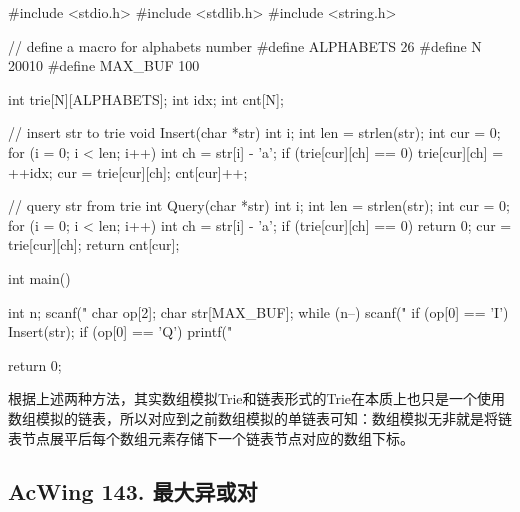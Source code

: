 \begin{mycpptwocol}[数组模拟Trie]
    #include <stdio.h>
    #include <stdlib.h>
    #include <string.h>

    // define a macro for alphabets number
    #define ALPHABETS 26
    #define N 20010
    #define MAX_BUF 100

    int trie[N][ALPHABETS];
    int idx;
    int cnt[N];

    // insert str to trie
    void Insert(char *str) {
        int i;
        int len = strlen(str);
        int cur = 0;
        for (i = 0; i < len; i++) {
            int ch = str[i] - 'a';
            if (trie[cur][ch] == 0) {
                trie[cur][ch] = ++idx;
            }
            cur = trie[cur][ch];
        }
        cnt[cur]++;
    }

    // query str from trie
    int Query(char *str) {
        int i;
        int len = strlen(str);
        int cur = 0;
        for (i = 0; i < len; i++) {
            int ch = str[i] - 'a';
            if (trie[cur][ch] == 0) {
                return 0;
            }
            cur = trie[cur][ch];
        }
        return cnt[cur];
    }

    int main()
        {
        int n;
        scanf("%
        char op[2];
        char str[MAX_BUF];
        while (n--) {
            scanf("%
            if (op[0] == 'I') {
                Insert(str);
            }
            if (op[0] == 'Q') {
                printf("%
            }
        }

        return 0;
    }
\end{mycpptwocol}

\begin{information}
    根据上述两种方法，其实数组模拟Trie和链表形式的Trie在本质上也只是一个使用数组模拟的链表，所以对应到之前数组模拟的单链表可知：数组模拟无非就是将链表节点展平后每个数组元素存储下一个链表节点对应的数组下标。
\end{information}

\subsection{AcWing 143. 最大异或对}

